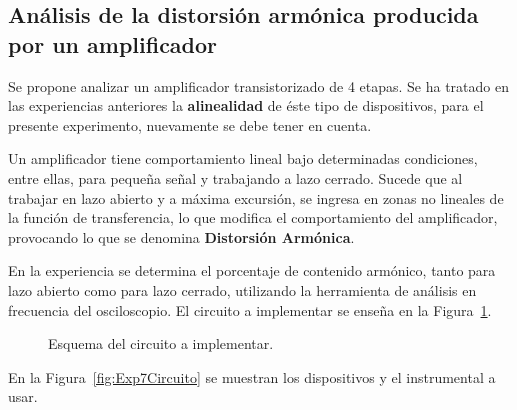   \subsection{Análisis de la distorsión armónica producida por un amplificador}
    Se propone analizar un amplificador transistorizado de 4 etapas. Se ha tratado 
    en las experiencias anteriores la \textbf{alinealidad} de éste tipo de dispositivos, 
    para el presente experimento, nuevamente se debe tener en cuenta. 

    Un amplificador tiene comportamiento lineal bajo determinadas condiciones, entre ellas, 
    para pequeña señal y trabajando a lazo cerrado. Sucede que al trabajar en lazo abierto y 
    a máxima excursión, se ingresa en zonas no lineales de la función de transferencia, lo que 
    modifica el comportamiento del amplificador, provocando lo que se denomina 
    \textbf{Distorsión Armónica}.

    En la experiencia se determina el porcentaje de contenido armónico, tanto para lazo 
    abierto como para lazo cerrado, utilizando la 
    herramienta de análisis en frecuencia del osciloscopio. El circuito a implementar 
    se enseña en la Figura~\ref{fig:Exp7EsquemaCircuito}.

      \begin{figure}[H]
        \centering
          \caption{Esquema del circuito a implementar.}
          \label{fig:Exp7EsquemaCircuito}
      \end{figure}

    En la Figura~\ref{fig:Exp7Circuito} se muestran los dispositivos y el 
    instrumental a usar.

